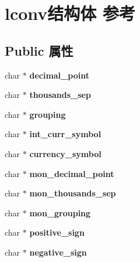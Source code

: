 \hypertarget{structlconv}{}\section{lconv结构体 参考}
\label{structlconv}
\subsection*{Public 属性}
\begin{DoxyCompactItemize}
\item 
\mbox{\label{structlconv_a445e27fc7f797c8cca97b381f062fb60}} 
char $\ast$ {\bfseries decimal\+\_\+point}
\item 
\mbox{\label{structlconv_aede8dfaac91d7b4e6b7fb0d96184d74d}} 
char $\ast$ {\bfseries thousands\+\_\+sep}
\item 
\mbox{\label{structlconv_a46e468755a823be50de20f36be5ff2be}} 
char $\ast$ {\bfseries grouping}
\item 
\mbox{\label{structlconv_abaeeafb02b68ba58c549458b196b9325}} 
char $\ast$ {\bfseries int\+\_\+curr\+\_\+symbol}
\item 
\mbox{\label{structlconv_af3657bb8bf2a83a868cdeb0b108ab921}} 
char $\ast$ {\bfseries currency\+\_\+symbol}
\item 
\mbox{\label{structlconv_a1aa08afe707c1d5d40b4d01369176480}} 
char $\ast$ {\bfseries mon\+\_\+decimal\+\_\+point}
\item 
\mbox{\label{structlconv_a4f04f4fd9ea670d21fc76fb5c77c032d}} 
char $\ast$ {\bfseries mon\+\_\+thousands\+\_\+sep}
\item 
\mbox{\label{structlconv_a12ecf5d2f7ceb0cfe0f66fd3200eef54}} 
char $\ast$ {\bfseries mon\+\_\+grouping}
\item 
\mbox{\label{structlconv_a74bf5f6f32624be629f7de0dabd58a96}} 
char $\ast$ {\bfseries positive\+\_\+sign}
\item 
\mbox{\label{structlconv_a40dbb1b1d7fdf4926145138f5d8f6f5f}} 
char $\ast$ {\bfseries negative\+\_\+sign}

\end{DoxyCompactItemize}
